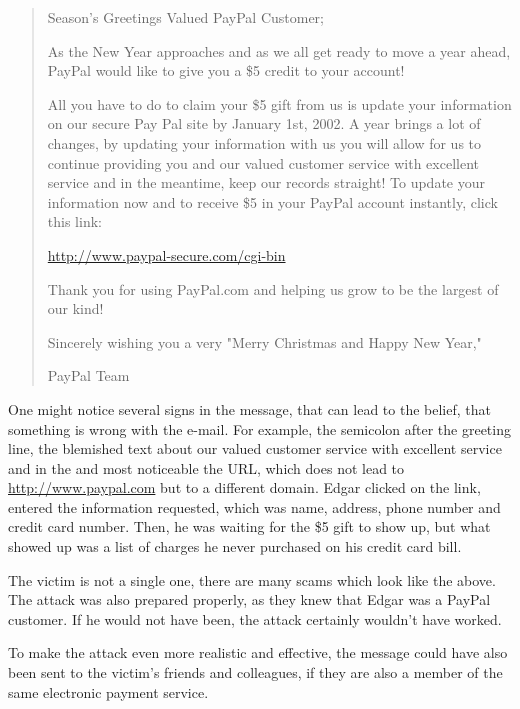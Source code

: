 \begin{quote}
Season's Greetings Valued PayPal Customer;

As the New Year approaches and as we all get ready to move a year ahead,
PayPal would like to give you a \$5 credit to your account!

All you have to do to claim your \$5 gift from us is update your information on
our secure Pay Pal site by January 1st, 2002. A year brings a lot of changes,
by updating your information with us you will allow for us to continue
providing you and our valued customer service with excellent service and in the
meantime, keep our records straight! To update your information now and to
receive \$5 in your PayPal account instantly, click this link:

\url{http://www.paypal-secure.com/cgi-bin}

Thank you for using PayPal.com and helping us grow to be the largest of our
kind!

Sincerely wishing you a very "Merry Christmas and Happy New Year,"

PayPal Team

\end{quote}

One might notice several signs in the message, that can lead to the belief,
that something is wrong with the e-mail. For example, the semicolon after the
greeting line, the blemished text about 
\glqq{}our valued customer service with excellent service and in the\grqq{} and
most noticeable the URL, which does not lead to \url{http://www.paypal.com} but
to a different domain. Edgar clicked on the link, entered the information
requested, which was name, address, phone number and credit card number. Then,
he was waiting for the \$5 gift to show up, but what showed up was a list of
charges he never purchased on his credit card bill.

The victim is not a single one, there are many scams which look like the above.
The attack was also prepared properly, as they knew that Edgar was a PayPal
customer. If he would not have been, the attack certainly wouldn't have worked.

To make the attack even more realistic and effective, the message could have also
been sent to the victim's friends and colleagues, if they are also a member of
the same electronic payment service.

